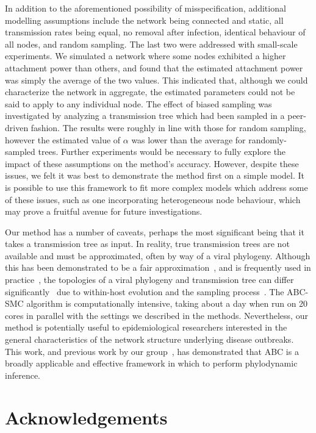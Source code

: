 \documentclass[12pt]{article}\usepackage[]{graphicx}\usepackage[]{color}
\begin{document}
In addition to the aforementioned possibility of misspecification, additional
modelling assumptions include the network being connected and static, all
transmission rates being equal, no removal after infection, identical behaviour
of all nodes, and random sampling. The last two were addressed with small-scale
experiments. We simulated a network where some nodes exhibited a higher
attachment power than others, and found that the estimated attachment power was
simply the average of the two values. This indicated that, although we could
characterize the network in aggregate, the estimated parameters could not be
said to apply to any individual node. The effect of biased sampling was
investigated by analyzing a transmission tree which had been sampled in a
peer-driven fashion. The results were roughly in line with those for random
sampling, however the estimated value of $\alpha$ was lower than the average
for randomly-sampled trees. Further experiments would be necessary to fully
explore the impact of these assumptions on the method's accuracy. However,
despite these issues, we felt it was best to demonstrate the method first on a
simple model. It is possible to use this framework to fit more complex models
which address some of these issues, such as one incorporating heterogeneous
node behaviour, which may prove a fruitful avenue
for future investigations.

Our method has a number of caveats, perhaps the most significant being that it
takes a transmission tree as input. In reality, true transmission trees are not
available and must be approximated, often by way of a viral phylogeny. Although
this has been demonstrated to be a fair
approximation~\autocite[e.g.][]{leitner1996accurate}, and is frequently used in
practice~\autocite[e.g.][]{stadler2013uncovering}, the topologies of a viral
phylogeny and transmission tree can differ
significantly~\autocite{ypma2013relating} due to within-host evolution and the
sampling process~\autocite{giardina2016inference}. The ABC-SMC algorithm is
computationally intensive, taking about a day when run on 20 cores in parallel
with the settings we described in the methods. Nevertheless, our method is
potentially useful to epidemiological researchers interested in the general
characteristics of the network structure underlying disease outbreaks. This
work, and previous work by our group~\autocite{poon2015phylodynamic}, has
demonstrated that ABC is a broadly applicable and effective framework in which
to perform phylodynamic inference.

\section*{Acknowledgements}
\end{document}
